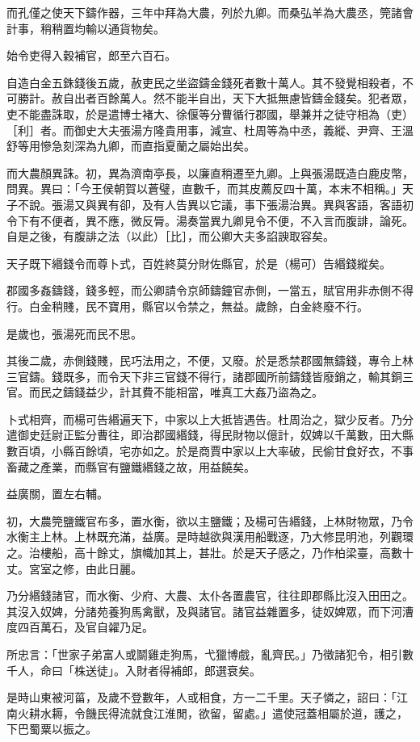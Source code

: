 \begin{pinyinscope}
而孔僅之使天下鑄作器，三年中拜為大農，列於九卿。而桑弘羊為大農丞，筦諸會計事，稍稍置均輸以通貨物矣。

始令吏得入穀補官，郎至六百石。

自造白金五銖錢後五歲，赦吏民之坐盜鑄金錢死者數十萬人。其不發覺相殺者，不可勝計。赦自出者百餘萬人。然不能半自出，天下大抵無慮皆鑄金錢矣。犯者眾，吏不能盡誅取，於是遣博士褚大、徐偃等分曹循行郡國，舉兼并之徒守相為（吏）［利］者。而御史大夫張湯方隆貴用事，減宣、杜周等為中丞，義縱、尹齊、王溫舒等用慘急刻深為九卿，而直指夏蘭之屬始出矣。

而大農顏異誅。初，異為濟南亭長，以廉直稍遷至九卿。上與張湯既造白鹿皮幣，問異。異曰：「今王侯朝賀以蒼璧，直數千，而其皮薦反四十萬，本末不相稱。」天子不說。張湯又與異有卻，及有人告異以它議，事下張湯治異。異與客語，客語初令下有不便者，異不應，微反脣。湯奏當異九卿見令不便，不入言而腹誹，論死。自是之後，有腹誹之法（以此）［比］，而公卿大夫多諂諛取容矣。

天子既下緡錢令而尊卜式，百姓終莫分財佐縣官，於是（楊可）告緡錢縱矣。

郡國多姦鑄錢，錢多輕，而公卿請令京師鑄鐘官赤側，一當五，賦官用非赤側不得行。白金稍賤，民不寶用，縣官以令禁之，無益。歲餘，白金終廢不行。

是歲也，張湯死而民不思。

其後二歲，赤側錢賤，民巧法用之，不便，又廢。於是悉禁郡國無鑄錢，專令上林三官鑄。錢既多，而令天下非三官錢不得行，諸郡國所前鑄錢皆廢銷之，輸其銅三官。而民之鑄錢益少，計其費不能相當，唯真工大姦乃盜為之。

卜式相齊，而楊可告緡遍天下，中家以上大抵皆遇告。杜周治之，獄少反者。乃分遣御史廷尉正監分曹往，即治郡國緡錢，得民財物以億計，奴婢以千萬數，田大縣數百頃，小縣百餘頃，宅亦如之。於是商賈中家以上大率破，民偷甘食好衣，不事畜藏之產業，而縣官有鹽鐵緡錢之故，用益饒矣。

益廣關，置左右輔。

初，大農筦鹽鐵官布多，置水衡，欲以主鹽鐵；及楊可告緡錢，上林財物眾，乃令水衡主上林。上林既充滿，益廣。是時越欲與漢用船戰逐，乃大修昆明池，列觀環之。治樓船，高十餘丈，旗幟加其上，甚壯。於是天子感之，乃作柏梁臺，高數十丈。宮室之修，由此日麗。

乃分緡錢諸官，而水衡、少府、大農、太仆各置農官，往往即郡縣比沒入田田之。其沒入奴婢，分諸苑養狗馬禽獸，及與諸官。諸官益雜置多，徒奴婢眾，而下河漕度四百萬石，及官自糴乃足。

所忠言：「世家子弟富人或鬬雞走狗馬，弋獵博戲，亂齊民。」乃徵諸犯令，相引數千人，命曰「株送徒」。入財者得補郎，郎選衰矣。

是時山東被河菑，及歲不登數年，人或相食，方一二千里。天子憐之，詔曰：「江南火耕水耨，令饑民得流就食江淮閒，欲留，留處。」遣使冠蓋相屬於道，護之，下巴蜀粟以振之。


\end{pinyinscope}
